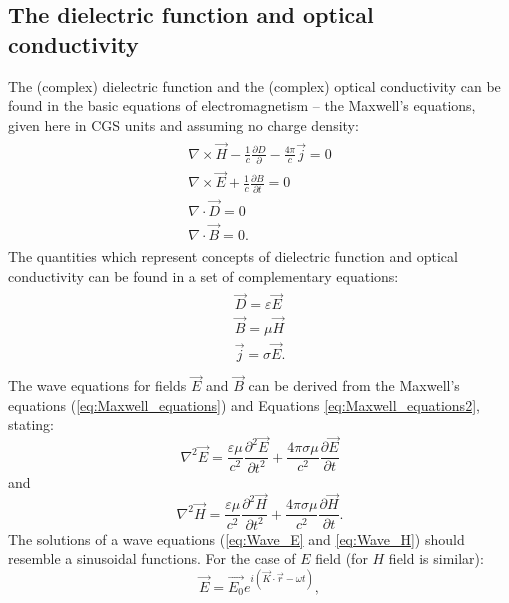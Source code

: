 \documentclass[titlepage,a4paper]{book}
\newcommand{\wciecie}{\quad\phantom{v}}
\begin{document}
\subsection{The dielectric function and optical conductivity}
\label{section:Maxwell_equations}
\wciecie
The (complex) dielectric function and the (complex) optical conductivity can be found in the basic equations of electromagnetism -- the Maxwell's equations, given here in CGS units and assuming no charge density:
\begin{eqnarray}
\label{eq:Maxwell_equations}
\begin{aligned}
\nabla \times \vec{H} - \frac{1}{c}\frac{\partial D}{\partial} - \frac{4\pi}{c}\vec{j} = 0 \\
\nabla \times \vec{E} + \frac{1}{c}\frac{\partial B}{\partial t}= 0 \\
\nabla \cdot \vec{D} = 0 \\
\nabla \cdot \vec{B} = 0.
\end{aligned}
\end{eqnarray}
The quantities which represent concepts of dielectric function and optical conductivity can be found in a set of complementary equations:
\begin{eqnarray}
\begin{aligned}
\label{eq:Maxwell_equations2}
\vec{D} = \varepsilon \vec{E} \\
\vec{B} = \mu \vec{H} \\
\vec{j} = \sigma \vec{E}. \\
\end{aligned}
\end{eqnarray}
The wave equations for fields $\vec{E}$ and $\vec{B}$ can be derived from the Maxwell's equations (\ref{eq:Maxwell_equations}) and Equations \ref{eq:Maxwell_equations2}, stating:
\begin{equation}
\label{eq:Wave_E}
\nabla^2 \vec{E} = \frac{\varepsilon \mu}{c^2} \frac{\partial^2 \vec{E}}{\partial t^2} + \frac{4\pi \sigma \mu}{c^2} \frac{\partial \vec{E}}{\partial t}
\end{equation}
and
\begin{equation}
\label{eq:Wave_H}
\nabla^2 \vec{H} = \frac{\varepsilon \mu}{c^2} \frac{\partial^2 \vec{H}}{\partial t^2} + \frac{4\pi \sigma \mu}{c^2} \frac{\partial \vec{H}}{\partial t}.
\end{equation}
The solutions of a wave equations (\ref{eq:Wave_E} and \ref{eq:Wave_H}) should resemble a sinusoidal functions. For the case of $E$ field (for $H$ field is similar):
\begin{equation}
\label{eq:Solution_E}
\vec{E} = \vec{E_0}e^{i(\vec{K}\cdot\vec{r} - \omega t)},
\end{equation}
\end{document}

